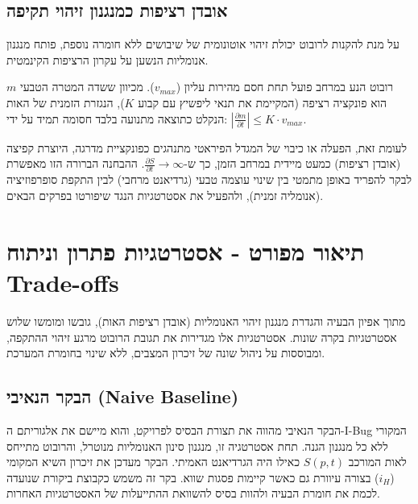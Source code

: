 \documentclass[12pt, a4paper]{article}
\begin{document}
\subsection{אובדן רציפות כמנגנון זיהוי תקיפה}
על מנת להקנות לרובוט יכולת זיהוי אוטונומית של שיבושים ללא חומרה נוספת, פותח מנגנון אנומליות הנשען על עקרון הרציפות הקינמטית. 

רובוט הנע במרחב פועל תחת חסם מהירות עליון ($v_{max}$). מכיוון ששדה המטרה הטבעי $m$ הוא פונקציה רציפה (המקיימת את תנאי ליפשיץ עם קבוע $K$), הנגזרת הזמנית של האות הנקלט כתוצאה מתנועה בלבד חסומה תמיד על ידי: $\left| \frac{\partial m}{\partial t} \right| \le K \cdot v_{max}$.

לעומת זאת, הפעלה או כיבוי של המגדל הפיראטי מתנהגים כפונקציית מדרגה, היוצרת קפיצה (אובדן רציפות) כמעט מיידית במרחב הזמן, כך ש-$\frac{\partial S}{\partial t} \to \infty$. ההבחנה הברורה הזו מאפשרת לבקר להפריד באופן מתמטי בין שינוי עוצמה טבעי (גרדיאנט מרחבי) לבין התקפת סופרפוזיציה (אנומליה זמנית), ולהפעיל את אסטרטגיות הנגד שיפורטו בפרקים הבאים.



\section{תיאור מפורט - אסטרטגיות פתרון וניתוח \textenglish{Trade-offs}}
מתוך אפיון הבעיה והגדרת מנגנון זיהוי האנומליות (אובדן רציפות האות), גובשו ומומשו שלוש אסטרטגיות בקרה שונות. אסטרטגיות אלו מגדירות את תגובת הרובוט מרגע זיהוי ההתקפה, ומבוססות על ניהול שונה של זיכרון המצבים, ללא שינוי בחומרת המערכת.

\subsection{הבקר הנאיבי (\textenglish{Naive Baseline})}
הבקר הנאיבי מהווה את תצורת הבסיס לפרויקט, והוא מיישם את אלגוריתם ה-\textenglish{I-Bug} המקורי ללא כל מנגנון הגנה. תחת אסטרטגיה זו, מנגנון סינון האנומליות מנוטרל, והרובוט מתייחס לאות המורכב $S(p,t)$ כאילו היה הגרדיאנט האמיתי. הבקר מעדכן את זיכרון השיא המקומי ($i_H$) בצורה עיוורת גם כאשר קיימות פסגות שווא. בקר זה משמש כקבוצת ביקורת שנועדה לכמת את חומרת הבעיה ולהוות בסיס להשוואת ההתייעלות של האסטרטגיות האחרות.
\end{document}
